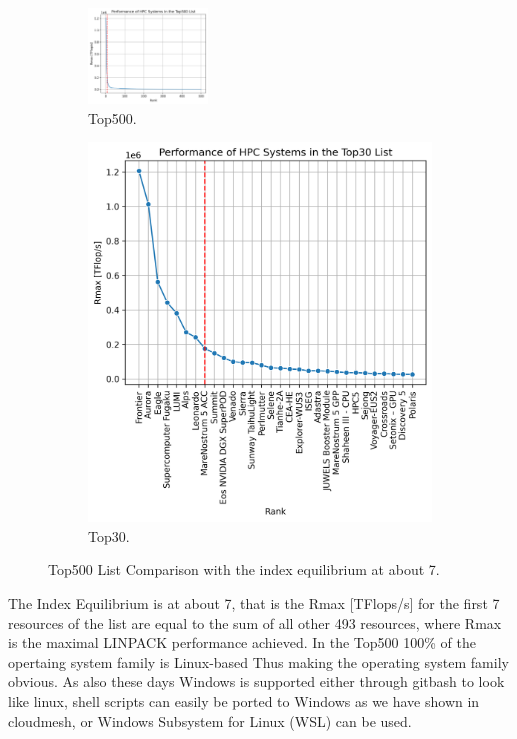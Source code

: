 \documentclass[utf8]{FrontiersinVancouver} %
\begin{document}
\begin{figure}[htb]
    \begin{subfigure}{0.45\columnwidth}
        \centering
        \includegraphics[height=1in]{images/top500/top500.png}
        \caption{Top500.}
        \label{fig:top500}
    \end{subfigure}
    \hfill
    \begin{subfigure}{0.45}
        \centering
        \includegraphics[width=\textwidth]{images/top500/top30.png}
        \caption{Top30.}
        \label{fig:top30}
    \end{subfigure}
    
    \caption{Top500 List Comparison with the index equilibrium at about 7.}
    \label{fig:top500comparison}
\end{figure}

The Index Equilibrium is at about 7, that is the Rmax [TFlops/s] for
the first 7 resources of the list are equal to the sum of all other
493 resources, where Rmax is the maximal LINPACK performance achieved.
In the Top500 100\% of the opertaing system family is Linux-based Thus
making the operating system family obvious. As also these days Windows
is supported either through gitbash to look like linux, shell scripts
can easily be ported to Windows as we have shown in cloudmesh, or
Windows Subsystem for Linux (WSL) can be used.  
\end{document}

